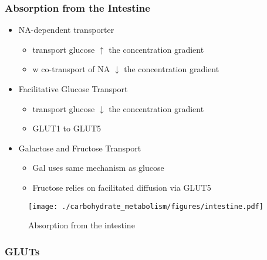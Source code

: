 \documentclass{scrartcl}
\begin{document}
\subsubsection{Absorption from the Intestine}
\label{sec:org94c0fe7}
\begin{itemize}
\item NA-dependent transporter
\begin{itemize}
\item transport glucose \(\uparrow\) the concentration gradient
\item w co-transport of NA \(\downarrow\) the concentration gradient
\end{itemize}
\item Facilitative Glucose Transport
\begin{itemize}
\item transport glucose \(\downarrow\) the concentration gradient
\item GLUT1 to GLUT5
\end{itemize}
\item Galactose and Fructose Transport
\begin{itemize}
\item Gal uses same mechanism as glucose
\item Fructose relies on facilitated diffusion via GLUT5
\end{itemize}
\end{itemize}

\begin{figure}[htbp]
\centering
\texttt{[image: ./carbohydrate\_metabolism/figures/intestine.pdf]}
\caption{\label{fig:orgb3a7c2c}
Absorption from the intestine}
\end{figure}

\subsubsection{GLUTs}
\label{sec:org11fc6a1}
\end{document}
